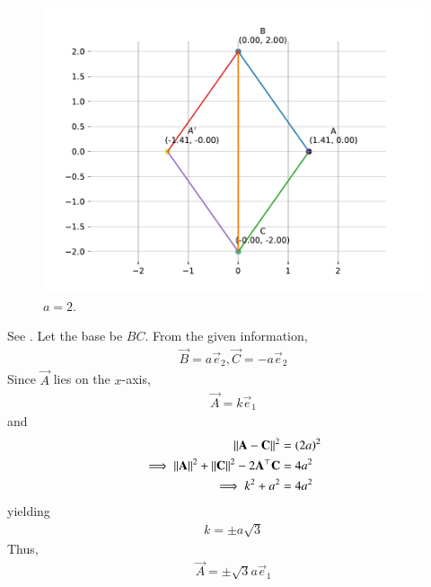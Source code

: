 	\begin{figure}[H]
		\centering
 \includegraphics[width=0.75\columnwidth]{chapters/11/10/1/2/figs/fig.pdf}
		\caption{$a = 2$.}
		\label{fig:11/10/1/2}
  	\end{figure}
		See .
	Let the base be $BC$.  From the given information, 
\begin{align}
	\vec{B} = a\vec{e}_2,
	\vec{C} = -a\vec{e}_2
\end{align}
Since $\vec{A}$ lies on the $x$-axis, 
\begin{align}
	\vec{A} = k\vec{e}_1
\end{align}
and 
\begin{align}
	\left\lVert\mathbf{A}-\mathbf{C}\right\rVert^2 &= \left(2a\right)^2
	\\
	\implies \left\lVert\mathbf{A}\right\rVert^2+\left\lVert\mathbf{C}\right\rVert^2 - 2 \mathbf{A}^{\top}\mathbf{C} &= 4a^2
	\\
	\implies k^2 +a^2 &= 4a^2
\end{align}
yielding
\begin{align}
 k = \pm a\sqrt{3}
\end{align}
Thus, 
\begin{align}
	\vec{A} = \pm \sqrt{3}a\vec{e}_1
\end{align}

